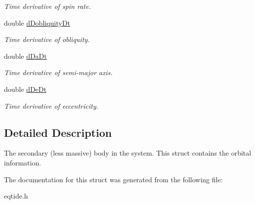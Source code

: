 \begin{DoxyCompactItemize}
\begin{DoxyCompactList}\small\item\em Time derivative of spin rate. \end{DoxyCompactList}\item 
\hypertarget{struct_s_e_c_o_n_d_a_r_y_a4f9791128af1047fc2b2be649ca734d8}{}double \hyperlink{struct_s_e_c_o_n_d_a_r_y_a4f9791128af1047fc2b2be649ca734d8}{d\+Dobliquity\+Dt}\label{struct_s_e_c_o_n_d_a_r_y_a4f9791128af1047fc2b2be649ca734d8}

\begin{DoxyCompactList}\small\item\em Time derivative of obliquity. \end{DoxyCompactList}\item 
\hypertarget{struct_s_e_c_o_n_d_a_r_y_aa3301a8258abd160e8722d6befc6a7ec}{}double \hyperlink{struct_s_e_c_o_n_d_a_r_y_aa3301a8258abd160e8722d6befc6a7ec}{d\+Da\+Dt}\label{struct_s_e_c_o_n_d_a_r_y_aa3301a8258abd160e8722d6befc6a7ec}

\begin{DoxyCompactList}\small\item\em Time derivative of semi-\/major axis. \end{DoxyCompactList}\item 
\hypertarget{struct_s_e_c_o_n_d_a_r_y_a1f666390150420239c2b5e2dd03cd550}{}double \hyperlink{struct_s_e_c_o_n_d_a_r_y_a1f666390150420239c2b5e2dd03cd550}{d\+De\+Dt}\label{struct_s_e_c_o_n_d_a_r_y_a1f666390150420239c2b5e2dd03cd550}

\begin{DoxyCompactList}\small\item\em Time derivative of eccentricity. \end{DoxyCompactList}\end{DoxyCompactItemize}


\subsection{Detailed Description}
The secondary (less massive) body in the system. This struct contains the orbital information. 

The documentation for this struct was generated from the following file\+:\begin{DoxyCompactItemize}
\item 
eqtide.\+h\end{DoxyCompactItemize}
